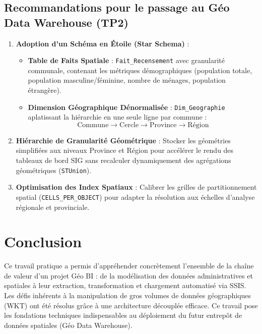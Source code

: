 \documentclass[12pt,a4paper]{article}
\begin{document}
\subsection{Recommandations pour le passage au Géo Data Warehouse (TP2)}
\begin{enumerate}[leftmargin=1.2cm]
    \item \textbf{Adoption d'un Schéma en Étoile (Star Schema)} :
    \begin{itemize}
        \item \textbf{Table de Faits Spatiale} : \texttt{Fait\_Recensement} avec granularité communale, contenant les métriques démographiques (population totale, population masculine/féminine, nombre de ménages, population étrangère).
        \item \textbf{Dimension Géographique Dénormalisée} : \texttt{Dim\_Geographie} aplatissant la hiérarchie en une seule ligne par commune :
        \[
        \text{Commune} \longrightarrow \text{Cercle} \longrightarrow \text{Province} \longrightarrow \text{Région}
        \]
    \end{itemize}
    \item \textbf{Hiérarchie de Granularité Géométrique} :
    Stocker les géométries simplifiées aux niveaux Province et Région pour accélérer le rendu des tableaux de bord SIG sans recalculer dynamiquement des agrégations géométriques (\texttt{STUnion}).
    \item \textbf{Optimisation des Index Spatiaux} :
    Calibrer les grilles de partitionnement spatial (\texttt{CELLS\_PER\_OBJECT}) pour adapter la résolution aux échelles d'analyse régionale et provinciale.
\end{enumerate}

\section{Conclusion}
Ce travail pratique a permis d'appréhender concrètement l'ensemble de la chaîne de valeur d'un projet Géo BI : de la modélisation des données administratives et spatiales à leur extraction, transformation et chargement automatisé via SSIS. Les défis inhérents à la manipulation de gros volumes de données géographiques (WKT) ont été résolus grâce à une architecture découplée efficace. Ce travail pose les fondations techniques indispensables au déploiement du futur entrepôt de données spatiales (Géo Data Warehouse).
\end{document}
